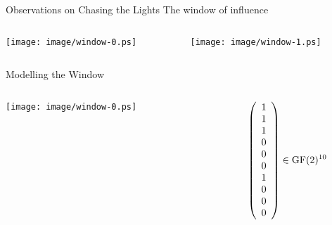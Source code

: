 \begin{frame}{Observations on Chasing the Lights}
	The window of influence
	\bigskip
	\begin{columns}
		\begin{column}{0.45\linewidth}
			\texttt{[image: image/window-0.ps]}
		\end{column}
		\begin{column}{0.45\linewidth}
			\texttt{[image: image/window-1.ps]}
		\end{column}
	\end{columns}
\end{frame}

\begin{frame}{Modelling the Window}
	\begin{columns}
		\begin{column}{0.45\linewidth}
			\texttt{[image: image/window-0.ps]}
		\end{column}
		\begin{column}{0.45\linewidth}
			\[
				\left(
				\begin{array}{c}
					1 \\
					1 \\
					1 \\
					0 \\
					0 \\
					0 \\
					1 \\
					0 \\
					0 \\
					0 \\
				\end{array}
				\right) \in \operatorname{GF}(2)^{10}
			\]
		\end{column}
	\end{columns}
	
\end{frame}

